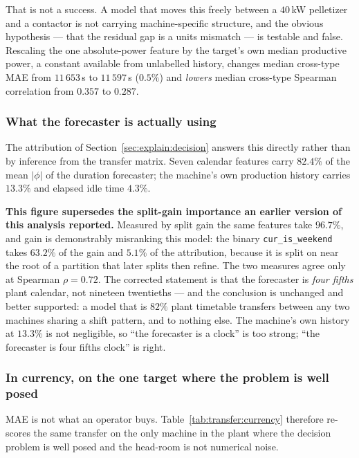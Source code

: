 That is not a success. A model that moves this freely between a $40$\,kW
pelletizer and a contactor is not carrying machine-specific structure,
and the obvious hypothesis --- that the residual gap is a units mismatch
--- is testable and false. Rescaling the one absolute-power feature by
the target's own median productive power, a constant available from
unlabelled history, changes median cross-type MAE from $11\,653$\,s to
$11\,597$\,s ($0.5\%$) and \emph{lowers} median cross-type Spearman
correlation from $0.357$ to $0.287$.

\subsubsection*{What the forecaster is actually using}

The attribution of Section~\ref{sec:explain:decision} answers this
directly rather than by inference from the transfer matrix. Seven
calendar features carry $\mathbf{82.4\%}$ of the mean $|\phi|$ of the
duration forecaster; the machine's own production history carries
$13.3\%$ and elapsed idle time $4.3\%$.

\textbf{This figure supersedes the split-gain importance an earlier
version of this analysis reported.} Measured by split gain the same
features take $96.7\%$, and gain is demonstrably misranking this model:
the binary \texttt{cur\_is\_weekend} takes $63.2\%$ of the gain and
$5.1\%$ of the attribution, because it is split on near the root of a
partition that later splits then refine. The two measures agree only at
Spearman $\rho=0.72$. The corrected statement is that the forecaster is
\emph{four fifths} plant calendar, not nineteen twentieths --- and the
conclusion is unchanged and better supported: a model that is $82\%$
plant timetable transfers between any two machines sharing a shift
pattern, and to nothing else. The machine's own history at $13.3\%$ is
not negligible, so ``the forecaster is a clock'' is too strong; ``the
forecaster is four fifths clock'' is right.

\subsubsection*{In currency, on the one target where the problem is well
posed}

MAE is not what an operator buys. Table~\ref{tab:transfer:currency}
therefore re-scores the same transfer on the only machine in the plant
where the decision problem is well posed and the head-room is not
numerical noise.

